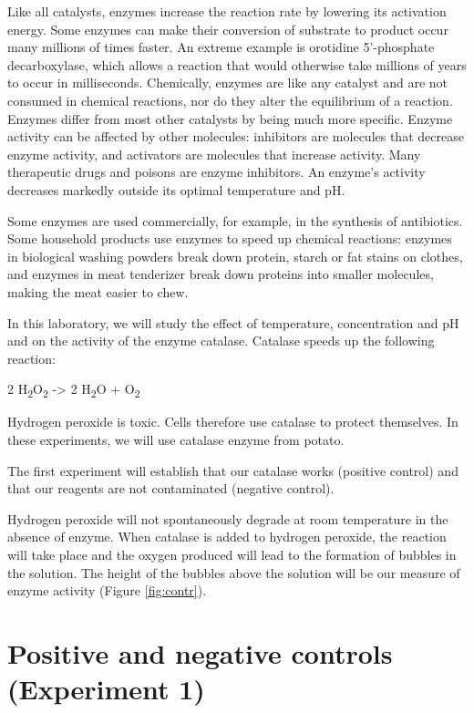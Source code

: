 \documentclass[]{book}
\theoremstyle{definition}
\theoremstyle{definition}
\theoremstyle{definition}
\theoremstyle{remark}
\begin{document}
Like all catalysts, enzymes increase the reaction rate by lowering its
activation energy. Some enzymes can make their conversion of substrate
to product occur many millions of times faster. An extreme example is
orotidine 5'-phosphate decarboxylase, which allows a reaction that would
otherwise take millions of years to occur in milliseconds. Chemically,
enzymes are like any catalyst and are not consumed in chemical
reactions, nor do they alter the equilibrium of a reaction. Enzymes
differ from most other catalysts by being much more specific. Enzyme
activity can be affected by other molecules: inhibitors are molecules
that decrease enzyme activity, and activators are molecules that
increase activity. Many therapeutic drugs and poisons are enzyme
inhibitors. An enzyme's activity decreases markedly outside its optimal
temperature and pH.

Some enzymes are used commercially, for example, in the synthesis of
antibiotics. Some household products use enzymes to speed up chemical
reactions: enzymes in biological washing powders break down protein,
starch or fat stains on clothes, and enzymes in meat tenderizer break
down proteins into smaller molecules, making the meat easier to chew.

In this laboratory, we will study the effect of temperature,
concentration and pH and on the activity of the enzyme catalase.
Catalase speeds up the following reaction:

2 H\textsubscript{2}O\textsubscript{2} -\textgreater{} 2
H\textsubscript{2}O + O\textsubscript{2}

Hydrogen peroxide is toxic. Cells therefore use catalase to protect
themselves. In these experiments, we will use catalase enzyme from
potato.

The first experiment will establish that our catalase works (positive
control) and that our reagents are not contaminated (negative control).

Hydrogen peroxide will not spontaneously degrade at room temperature in
the absence of enzyme. When catalase is added to hydrogen peroxide, the
reaction will take place and the oxygen produced will lead to the
formation of bubbles in the solution. The height of the bubbles above
the solution will be our measure of enzyme activity (Figure
\ref{fig:contr}).

\section{Positive and negative controls (Experiment
1)}\label{positive-and-negative-controls-experiment-1}
\end{document}
